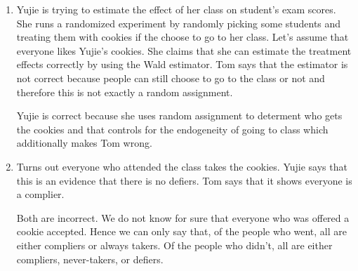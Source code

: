\documentclass[11pt]{SelfArxOneColBMN}
\begin{document}
\begin{enumerate}
  \item Yujie is trying to estimate the effect of her class on student's exam scores. She runs a randomized experiment by randomly picking some students and treating them with cookies if the choose to go to her class. Let's assume that everyone likes Yujie's cookies. She claims that she can estimate the treatment effects correctly by using the Wald estimator. Tom says that the estimator is not correct because people can still choose to go to the class or not and therefore this is not exactly a random assignment.

  \begin{solution}
    Yujie is correct because she uses random assignment to determent who gets the cookies and that controls for the endogeneity of going to class which additionally makes Tom wrong. 
  \end{solution}
  
  \item Turns out everyone who attended the class takes the cookies. Yujie says that this is an evidence that there is no defiers. Tom says that it shows everyone is a complier. 
  \begin{solution}
    Both are incorrect. We do not know for sure that everyone who was offered a cookie accepted. Hence we can only say that, of the people who went, all are either compliers or always takers. Of the people who didn't, all are either compliers, never-takers, or defiers. 
  \end{solution}

\end{enumerate}
\end{document}
